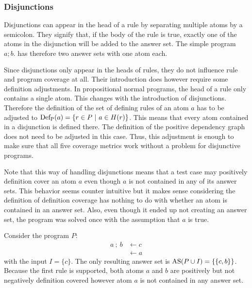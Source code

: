 \subsubsection{Disjunctions}
\label{subsubsec:Coverage for further program classes/Language constructs/Disjunctions}
Disjunctions can appear in the head of a rule by separating multiple atoms by a semicolon. They signify that, if the body of the rule is true, exactly one of the atoms in the disjunction will be added to the answer set. The simple program \(a ; b.\) has therefore two answer sets with one atom each.

Since disjunctions only appear in the heads of rules, they do not influence rule and program coverage at all. Their introduction does however require some definition adjustments. In propositional normal programs, the head of a rule only contains a single atom. This changes with the introduction of disjunctions. Therefore the definition of the set of defining rules of an atom $a$ has to be adjusted to \(\Def(a) = \{r \in P\ |\ a \in H(r)\}\). This means that every atom contained in a disjunction is defined there. The definition of the positive dependency graph does not need to be adjusted in this case. Thus, this adjustment is enough to make sure that all five coverage metrics work without a problem for disjunctive programs. 

Note that this way of handling disjunctions means that a test case may positively definition cover an atom $a$ even though $a$ is not contained in any of its answer sets. This behavior seems counter intuitive but it makes sense considering the definition of definition coverage has nothing to do with whether an atom is contained in an answer set. Also, even though it ended up not creating an answer set, the program was solved once with the assumption that $a$ is true.

\begin{example}
    Consider the program $P$:
    \begin{align*}
        a\ ;\ b &\leftarrow c \\
        &\leftarrow a
    \end{align*}
    with the input \(I = \{c\}\). The only resulting answer set is \(\operatorname{AS}(P \cup I) = \{\{c, b\}\}\). Because the first rule is supported, both atoms $a$ and $b$ are positively but not negatively definition covered however atom $a$ is not contained in any answer set.
\end{example}


